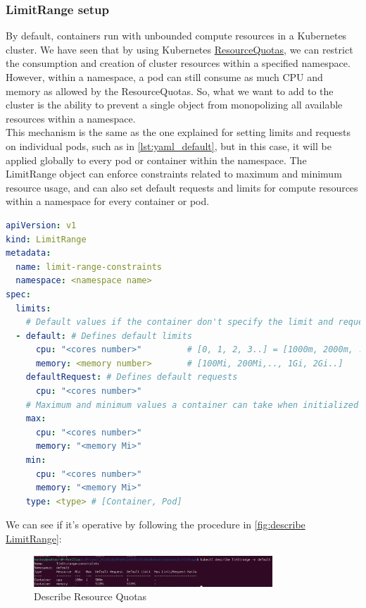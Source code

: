 \subsubsection{LimitRange setup}
\label{subsec:limitRange}
By default, containers run with unbounded compute resources in a Kubernetes cluster.
We have seen that by using Kubernetes \hyperref[subsec:resourceQuotas]{ResourceQuotas}, we can restrict the consumption and creation of cluster resources within a specified namespace.
However, within a namespace, a pod can still consume as much CPU and memory as allowed by the ResourceQuotas. So, what we want to add to the cluster is the ability to prevent a single object from monopolizing all available resources within a namespace.\\
This mechanism is the same as the one explained for setting limits and requests on individual pods, such as in \autoref{lst:yaml_default}, but in this case, it will be applied globally to every pod or container within the namespace. The LimitRange object can enforce constraints related to maximum and minimum resource usage, and can also set default requests and limits for compute resources within a namespace for every container or pod.
\begin{lstlisting}[language=yaml, caption={LimitRange Setup}]
apiVersion: v1
kind: LimitRange
metadata:
  name: limit-range-constraints
  namespace: <namespace name>
spec:
  limits:
    # Default values if the container don't specify the limit and request:
  - default: # Defines default limits
      cpu: "<cores number>"         # [0, 1, 2, 3..] = [1000m, 2000m, ...]
      memory: <memory number>       # [100Mi, 200Mi,.., 1Gi, 2Gi..]
    defaultRequest: # Defines default requests
      cpu: "<cores number>"
    # Maximum and minimum values a container can take when initialized
    max:
      cpu: "<cores number>"
      memory: "<memory Mi>" 
    min:
      cpu: "<cores number>"
      memory: "<memory Mi>" 
    type: <type> # [Container, Pod]
\end{lstlisting}
We can see if it's operative by following the procedure in \autoref{fig:describe LimitRange}:
\begin{figure}[h!]
    \centering
    \includegraphics[width=0.8\textwidth]{images/describe_limit_range.png}
    \caption{Describe Resource Quotas}
    \label{fig:describe LimitRange}
\end{figure}

